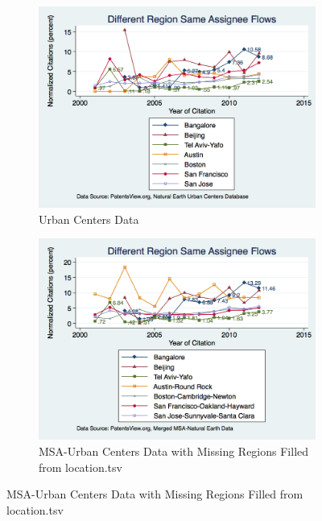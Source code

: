 \documentclass[12pt]{article}
\begin{document}
\begin{figure}
  \begin{subfigure}[b]{\textwidth}
    \includegraphics[width=\textwidth]{UCDiffRegionSameAssigneeFlows}
    \caption{Urban Centers Data}
    \label{fig:UCDiffRegionSameAssigneeFlows}
  \end{subfigure}
  
  \begin{subfigure}[b]{\textwidth}
    \includegraphics[width=\textwidth]{DiffRegionSameAssigneeFlows}
    \caption{MSA-Urban Centers Data with Missing Regions Filled from location.tsv}
    \label{fig:DiffRegionSameAssigneeFlows}
  \end{subfigure}
\end{figure}
\end{document}
